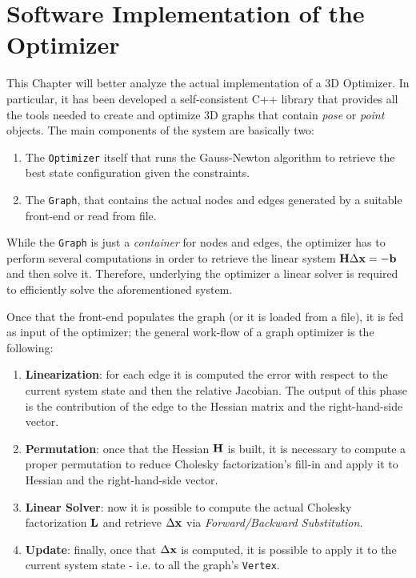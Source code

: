 \chapter{Software Implementation of the Optimizer}\label{ch:implementation}
This Chapter will better analyze the actual implementation of a 3D Optimizer. In particular, it has been developed a self-consistent C++ library that provides all the tools needed to create and optimize 3D graphs that contain \textit{pose} or \textit{point} objects. The main components of the system are basically two:

\begin{enumerate}
    \item The \texttt{Optimizer} itself that runs the Gauss-Newton algorithm to retrieve the best state configuration given the constraints.
    \item The \texttt{Graph}, that contains the actual nodes and edges generated by a suitable front-end or read from file.
\end{enumerate}

While the \texttt{Graph} is just a \textit{container} for nodes and edges, the optimizer has to perform several computations in order to retrieve the linear system $\mathbf{H} \Delta \mathbf{x} = -\mathbf{b}$ and then solve it. Therefore, underlying the optimizer a linear solver is required to efficiently solve the aforementioned system. 

Once that the front-end populates the graph (or it is loaded from a file), it is fed as input of the optimizer; the general work-flow of a graph optimizer is the following:

\begin{enumerate}
    \item \textbf{Linearization}: for each edge it is computed the error with respect to the current system state and then the relative Jacobian. The output of this phase is the contribution of the edge to the Hessian matrix and the right-hand-side vector.
    \item \textbf{Permutation}: once that the Hessian $\mathbf{H}$ is built, it is necessary to compute a proper permutation to reduce Cholesky factorization's fill-in and apply it to Hessian and the right-hand-side vector.
    \item \textbf{Linear Solver}: now it is possible to compute the actual Cholesky factorization $\mathbf{L}$ and retrieve $\Delta \mathbf{x}$ via \textit{Forward/Backward Substitution}.
    \item \textbf{Update}: finally, once that $\Delta \mathbf{x}$ is computed, it is possible to apply it to the current system state -  i.e. to all the graph's \texttt{Vertex}.
\end{enumerate}

